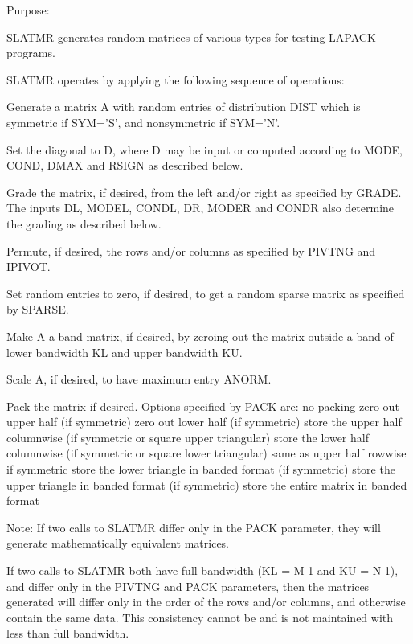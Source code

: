 \begin{DoxyParagraph}{Purpose\+: }
\begin{DoxyVerb}    SLATMR generates random matrices of various types for testing
    LAPACK programs.

    SLATMR operates by applying the following sequence of
    operations:

      Generate a matrix A with random entries of distribution DIST
         which is symmetric if SYM='S', and nonsymmetric
         if SYM='N'.

      Set the diagonal to D, where D may be input or
         computed according to MODE, COND, DMAX and RSIGN
         as described below.

      Grade the matrix, if desired, from the left and/or right
         as specified by GRADE. The inputs DL, MODEL, CONDL, DR,
         MODER and CONDR also determine the grading as described
         below.

      Permute, if desired, the rows and/or columns as specified by
         PIVTNG and IPIVOT.

      Set random entries to zero, if desired, to get a random sparse
         matrix as specified by SPARSE.

      Make A a band matrix, if desired, by zeroing out the matrix
         outside a band of lower bandwidth KL and upper bandwidth KU.

      Scale A, if desired, to have maximum entry ANORM.

      Pack the matrix if desired. Options specified by PACK are:
         no packing
         zero out upper half (if symmetric)
         zero out lower half (if symmetric)
         store the upper half columnwise (if symmetric or
             square upper triangular)
         store the lower half columnwise (if symmetric or
             square lower triangular)
             same as upper half rowwise if symmetric
         store the lower triangle in banded format (if symmetric)
         store the upper triangle in banded format (if symmetric)
         store the entire matrix in banded format

    Note: If two calls to SLATMR differ only in the PACK parameter,
          they will generate mathematically equivalent matrices.

          If two calls to SLATMR both have full bandwidth (KL = M-1
          and KU = N-1), and differ only in the PIVTNG and PACK
          parameters, then the matrices generated will differ only
          in the order of the rows and/or columns, and otherwise
          contain the same data. This consistency cannot be and
          is not maintained with less than full bandwidth.\end{DoxyVerb}
 
\end{DoxyParagraph}

